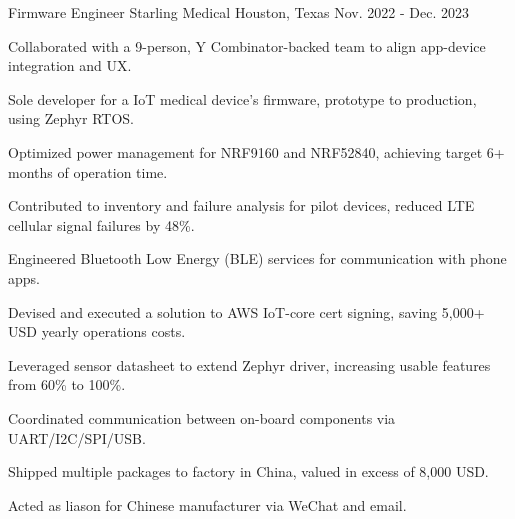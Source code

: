 

\begin{cventries}

  \cventry
    {Firmware Engineer} %
    {Starling Medical} %
    {Houston, Texas} %
    {Nov. 2022 - Dec. 2023} %
    {
      \begin{cvitems}
        \item {Collaborated with a 9-person, Y Combinator-backed team to align app-device integration and UX.}
        \item {Sole developer for a IoT medical device's firmware, prototype to production, using Zephyr RTOS.}
        \item {Optimized power management for NRF9160 and NRF52840, achieving target 6+ months of operation time.}
        \item {Contributed to inventory and failure analysis for pilot devices, reduced LTE cellular signal failures by 48\%.}
        \item {Engineered Bluetooth Low Energy (BLE) services for communication with phone apps.}
        \item {Devised and executed a solution to AWS IoT-core cert signing, saving 5,000+ USD yearly operations costs.}
        \item {Leveraged sensor datasheet to extend Zephyr driver, increasing usable features from 60\% to 100\%.}
        \item {Coordinated communication between on-board components via UART/I2C/SPI/USB.}
        \item {Shipped multiple packages to factory in China, valued in excess of 8,000 USD.}
        \item {Acted as liason for Chinese manufacturer via WeChat and email.}
      \end{cvitems}
    }


\end{cventries}
